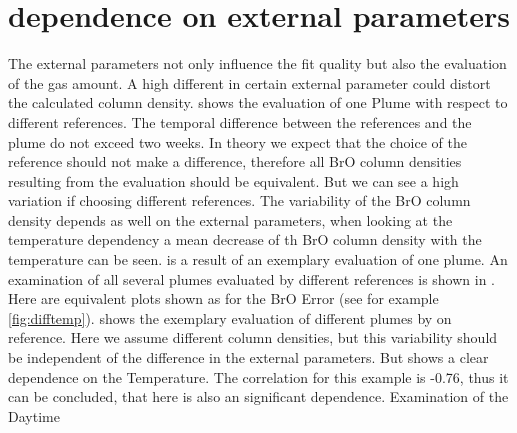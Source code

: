 \documentclass  [
  paper    = a4,
  BCOR     = 10mm,
  twoside,
  fontsize = 12pt,
  fleqn,
  toc      = bibnumbered,
  toc      = listofnumbered,
  numbers  = noendperiod,
  headings = normal,
  listof   = leveldown,
  version  = 3.03
]                                       {scrreprt}
\begin{document}
	\section{  dependence on external parameters}
	The external parameters not only influence the fit quality but also the evaluation of the gas amount. A high different in certain external parameter could distort the calculated   column density.  shows the evaluation of one Plume with respect to different references. The temporal difference between the references and the plume do not exceed two weeks. In theory we expect that the choice of  the reference should not make a difference, therefore all BrO column densities resulting from the evaluation should be equivalent. But we can see a high variation if choosing different references. The variability of the BrO column density depends as well on the external parameters, when looking at the temperature dependency a mean decrease of th BrO column density with the temperature can be seen.  is a result of an exemplary evaluation of one plume. An examination of all several plumes evaluated by different references is shown in . Here are equivalent plots shown as for the BrO Error (see for example \cref{fig:difftemp}).  shows the exemplary evaluation of different plumes by on reference. Here we assume different column densities, but this variability should be independent of the difference in the external parameters. But  shows a clear dependence on the Temperature. The correlation for this example is -0.76, thus it can be concluded, that here is also an significant dependence. 
	Examination of the Daytime 
\end{document}
